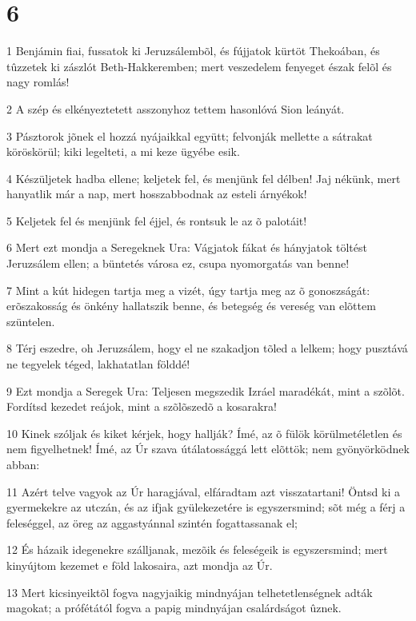 \chapter{6}

\par 1 Benjámin fiai, fussatok ki Jeruzsálembõl, és fújjatok kürtöt Thekoában, és tûzzetek ki zászlót Beth-Hakkeremben; mert veszedelem fenyeget észak felõl és nagy romlás!
\par 2 A szép és elkényeztetett asszonyhoz tettem hasonlóvá Sion leányát.
\par 3 Pásztorok jõnek el hozzá nyájaikkal együtt; felvonják mellette a sátrakat köröskörül; kiki legelteti, a mi keze ügyébe esik.
\par 4 Készüljetek hadba ellene; keljetek fel, és menjünk fel délben! Jaj nékünk, mert hanyatlik már a nap, mert hosszabbodnak az esteli árnyékok!
\par 5 Keljetek fel és menjünk fel éjjel, és rontsuk le az õ palotáit!
\par 6 Mert ezt mondja a Seregeknek Ura: Vágjatok fákat és hányjatok töltést Jeruzsálem ellen; a büntetés városa ez, csupa nyomorgatás van benne!
\par 7 Mint a kút hidegen tartja meg a vizét, úgy tartja meg az õ gonoszságát: erõszakosság és önkény hallatszik benne, és betegség és vereség van elõttem szüntelen.
\par 8 Térj eszedre, oh Jeruzsálem, hogy el ne szakadjon tõled a lelkem; hogy pusztává ne tegyelek téged, lakhatatlan földdé!
\par 9 Ezt mondja a Seregek Ura: Teljesen megszedik Izráel maradékát, mint a szõlõt. Fordítsd kezedet reájok, mint a szõlõszedõ a kosarakra!
\par 10 Kinek szóljak és kiket kérjek, hogy hallják? Ímé, az õ fülök körülmetéletlen és nem figyelhetnek! Ímé, az Úr szava útálatossággá lett elõttök; nem gyönyörködnek abban:
\par 11 Azért telve vagyok az Úr haragjával, elfáradtam azt visszatartani! Öntsd ki a gyermekekre az utczán, és az ifjak gyülekezetére is egyszersmind; sõt még a férj a feleséggel, az öreg az aggastyánnal szintén fogattassanak el;
\par 12 És házaik idegenekre szálljanak, mezõik és feleségeik is egyszersmind; mert kinyújtom kezemet e föld lakosaira, azt mondja az Úr.
\par 13 Mert kicsinyeiktõl fogva nagyjaikig mindnyájan telhetetlenségnek adták magokat; a prófétától fogva a papig mindnyájan csalárdságot ûznek.
